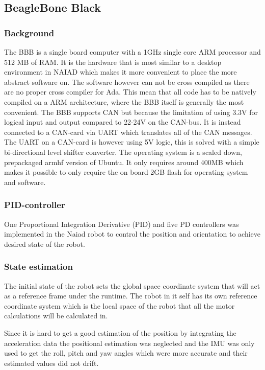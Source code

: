\subsection{BeagleBone Black} %
		\subsubsection{Background} %
The BBB is a single board computer with a 1GHz single core ARM processor and 512 MB of RAM. It is the hardware that is most similar to a desktop environment in NAIAD which makes it more convenient to place the more abstract software on. The software however can not be cross compiled as there are no proper cross compiler for Ada. This mean that all code has to be natively compiled on a ARM architecture, where the BBB itself is generally the most convenient. The BBB supports CAN but because the limitation of using 3.3V for logical input and output compared to 22-24V on the CAN-bus. It is instead connected to a CAN-card via UART which translates all of the CAN messages. The UART on a CAN-card is however using 5V logic, this is solved with a simple bi-directional level shifter converter. The operating system is a scaled down, prepackaged armhf\cite{armhf} version of Ubuntu. It only requires around 400MB which makes it possible to only require the on board 2GB flash for operating system and software.

		\subsubsection{PID-controller} %
\noindent 
One Proportional Integration Derivative (PID) and five PD controllers was implemented in the Naiad robot to control the position and orientation to achieve desired state of the robot.
\subsubsection*{State estimation}
The initial state of the robot sets the global space coordinate system that will act as a reference frame under the runtime. The robot in it self has its own reference coordinate system which is the local space of the robot that all the motor calculations will be calculated in.

Since it is hard to get a good estimation of the position by integrating the acceleration data the positional estimation was neglected and the IMU was only used to get the roll, pitch and yaw angles which were more accurate and their estimated values did not drift.

